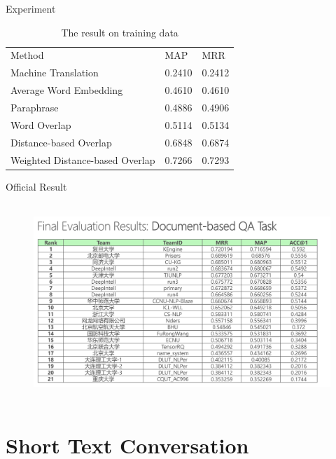 \documentclass[aspectratio=169]{beamer} %
\begin{document}
  \begin{frame}{Experiment}
    \begin{table}
    \centering
    \caption{The result on training data}
    \begin{tabular}{l@{\qquad}l@{\qquad}l}
    \hline\noalign{\smallskip}
    Method & MAP & MRR\\
    \noalign{\smallskip}
    \hline
    \noalign{\smallskip}
    Machine Translation     & 0.2410 & 0.2412  \\
    Average Word Embedding  & 0.4610 & 0.4610  \\
    Paraphrase              & 0.4886 & 0.4906  \\
    Word Overlap            & 0.5114 & 0.5134  \\
    \hline
    Distance-based Overlap  & 0.6848 & 0.6874  \\
    Weighted Distance-based Overlap   & 0.7266 & 0.7293  \\
    \hline
    \end{tabular}
    \end{table}
  \end{frame}

  \begin{frame}{Official Result}
    \begin{center}
      \begin{figure}
      \includegraphics[width=13cm,height=7.45cm]{result-dbqa.png}
      \end{figure}
    \end{center}
  \end{frame}

  \section{Short Text Conversation}
\end{document}
